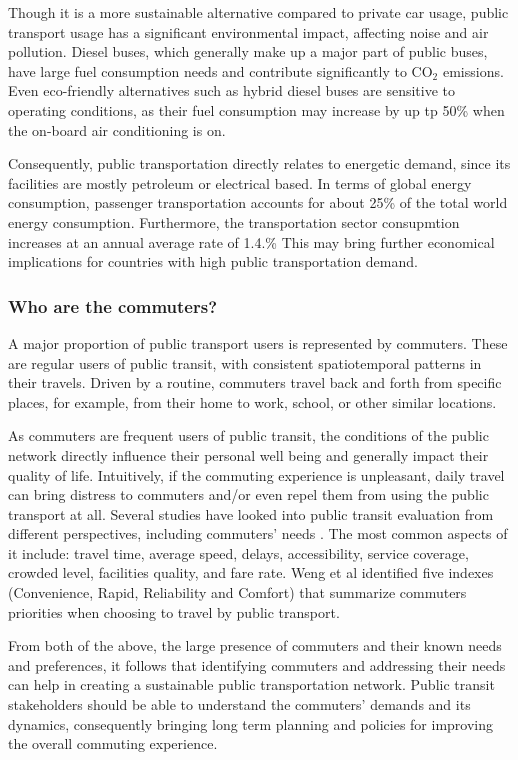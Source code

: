 \documentclass{article}
\begin{document}
Though it is a more sustainable alternative compared to private car usage, public transport usage has a significant environmental impact, affecting noise and air pollution. Diesel buses, which generally make up a major part of public buses, have large fuel consumption needs and contribute significantly to CO$_{2}$ emissions. Even eco-friendly alternatives such as hybrid diesel buses are sensitive to operating conditions, as their fuel consumption may increase by up tp 50\% when the on-board air conditioning is on.\cite{zhang2014real}

Consequently, public transportation directly relates to energetic demand, since its facilities are mostly petroleum or electrical based. In terms of global energy consumption, passenger transportation accounts for about 25\% of the total world energy consumption. Furthermore, the transportation sector consupmtion increases at an annual average rate of 1.4.\% \cite{eia2016energy} This may bring further economical implications for countries with high public transportation demand.

\subsubsection{Who are the commuters?}
A major proportion of public transport users is represented by commuters. These are regular users of public transit, with consistent spatiotemporal patterns in their travels. Driven by a routine, commuters travel back and forth from specific places, for example, from their home to work, school, or other similar locations. 

As commuters are frequent users of public transit, the  conditions of the public network directly influence their personal well being and generally impact their quality of life. Intuitively, if the commuting experience is unpleasant, daily travel can bring distress to commuters and/or even repel them from using the public transport at all. Several studies have looked into public transit evaluation from different perspectives, including commuters' needs \cite{mao2016commuting}. The most common aspects of it include: travel time, average speed, delays, accessibility, service coverage, crowded level, facilities quality, and fare rate. Weng et al \cite{weng2013bus} identified five indexes (Convenience, Rapid, Reliability and Comfort) that summarize commuters priorities when choosing to travel by public transport.
 
From both of the above, the large presence of commuters and their known needs and preferences, it follows that identifying commuters and addressing their needs can help in creating a sustainable public transportation network. Public transit stakeholders should be able to understand the commuters' demands and its dynamics, consequently bringing long term planning and policies for improving the overall commuting experience.
\end{document}
